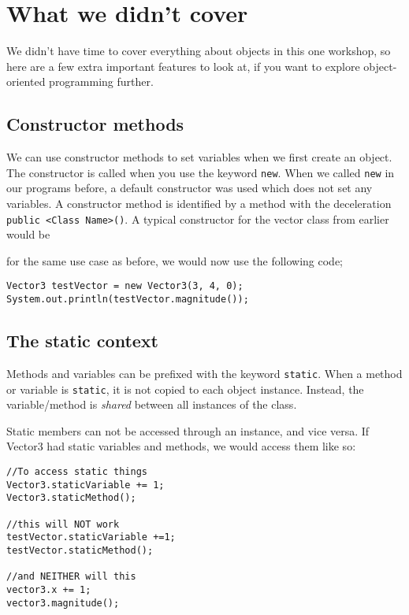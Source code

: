 \section{What we didn't cover}

	We didn't have time to cover everything about objects in this one workshop, so here are a few extra important features to look at, if you want to explore object-oriented programming further.
	
	\ifprint
	\else
		
		\subsection*{Constructor methods}
		
			We can use constructor methods to set variables when we first create an object.
			\ifprint\else The constructor is called when you use the keyword \texttt{new}. When we called \texttt{new} in our programs before, a default constructor was used which does not set any variables.\fi		
			A constructor method is identified by a method with the deceleration \texttt{public <Class Name>()}. A typical constructor for the vector class from earlier would be
			
			
			
			for the same use case as before, we would now use the following code;
			
			\begin{lstlisting}[style=Java, numbers=none]
Vector3 testVector = new Vector3(3, 4, 0);
System.out.println(testVector.magnitude());
			\end{lstlisting}
			
		\subsection*{The static context}
		
			Methods and variables can be prefixed with the keyword \texttt{static}. When a method or variable is \texttt{static}, it is not copied to each object instance. Instead, the variable/method is \textit{shared} between all instances of the class. 
			
			Static members can not be accessed through an instance, and vice versa. If Vector3 had static variables and methods, we would access them like so:
			
			\begin{lstlisting}[style=Java, numbers=none]
//To access static things
Vector3.staticVariable += 1;
Vector3.staticMethod();
	
//this will NOT work
testVector.staticVariable +=1;
testVector.staticMethod();
	
//and NEITHER will this
vector3.x += 1;
vector3.magnitude();
			\end{lstlisting}
			
